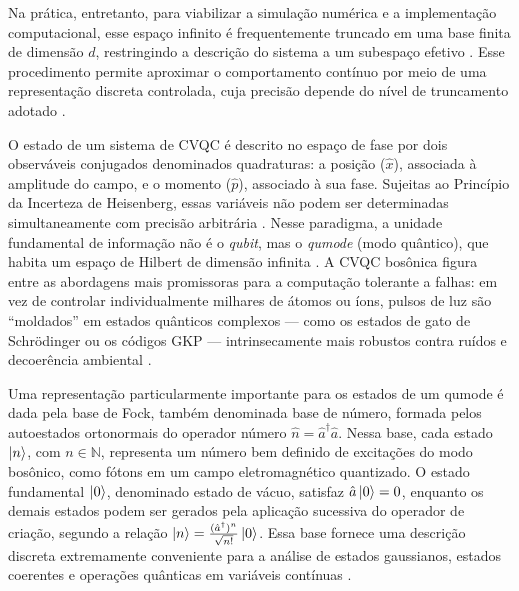 Na prática, entretanto, para viabilizar a simulação numérica e a implementação computacional, esse espaço infinito é frequentemente truncado em uma base finita de dimensão $d$, restringindo a descrição do sistema a um subespaço efetivo \cite{johansson2012qutip}. Esse procedimento permite aproximar o comportamento contínuo por meio de uma representação discreta controlada, cuja precisão depende do nível de truncamento adotado \cite{ripoll2022quantum}.

O estado de um sistema de CVQC é descrito no espaço de fase por dois observáveis conjugados denominados quadraturas: a posição ($\hat{x}$), associada à amplitude do campo, e o momento ($\hat{p}$), associado à sua fase. Sujeitas ao Princípio da Incerteza de Heisenberg, essas variáveis não podem ser determinadas simultaneamente com precisão arbitrária \cite{serafini_quantum_2023, weedbrook2012gaussian}. Nesse paradigma, a unidade fundamental de informação não é o \textit{qubit}, mas o \textit{qumode} (modo quântico), que habita um espaço de Hilbert de dimensão infinita \cite{lloyd1999quantum}. A CVQC bosônica figura entre as abordagens mais promissoras para a computação tolerante a falhas: 
em vez de controlar individualmente milhares de átomos ou íons, pulsos de luz são ``moldados'' em estados quânticos complexos --- como os estados de gato de Schrödinger ou os códigos GKP --- intrinsecamente mais robustos contra ruídos e decoerência ambiental \cite{gottesman2000encoding, bourassa2021blueprint}.

Uma representação particularmente importante para os estados de um qumode é dada pela base de Fock, também denominada base de número, formada pelos autoestados ortonormais do operador número \(\hat{n}=\hat{a}^{\dagger}\hat{a}\). Nessa base, cada estado \(\ket{n}\), com \(n\in\mathbb{N}\), representa um número bem definido de excitações do modo bosônico, como fótons em um campo eletromagnético quantizado. O estado fundamental \(\ket{0}\), denominado estado de vácuo, satisfaz \(\hat{a}\ket{0}=0\), enquanto os demais estados podem ser gerados pela aplicação sucessiva do operador de criação, segundo a relação \(\ket{n}=\frac{(\hat{a}^{\dagger})^n}{\sqrt{n!}}\ket{0}\). Essa base fornece uma descrição discreta extremamente conveniente para a análise de estados gaussianos, estados coerentes e operações quânticas em variáveis contínuas \cite{serafini_quantum_2023}.


